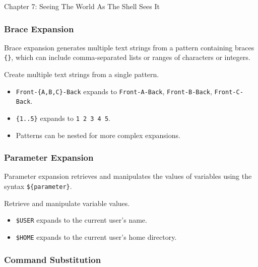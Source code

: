 \begin{notes}{Chapter 7: Seeing The World As The Shell Sees It}
\begin{highlight}
    \end{highlight}
    
    \subsubsection*{Brace Expansion}
    
    Brace expansion generates multiple text strings from a pattern containing braces \texttt{\{\}}, which can include comma-separated lists or ranges of characters or integers.
    
    \begin{highlight}
    
    Create multiple text strings from a single pattern.
    
    \begin{itemize}
        \item \texttt{Front-\{A,B,C\}-Back} expands to \texttt{Front-A-Back}, \texttt{Front-B-Back}, \texttt{Front-C-Back}.
        \item \texttt{\{1..5\}} expands to \texttt{1 2 3 4 5}.
        \item Patterns can be nested for more complex expansions.
    \end{itemize}
    
    \end{highlight}
    
    \subsubsection*{Parameter Expansion}
    
    Parameter expansion retrieves and manipulates the values of variables using the syntax \texttt{\$\{parameter\}}.
    
    \begin{highlight}
    
    Retrieve and manipulate variable values.
    
    \begin{itemize}
        \item \texttt{\$USER} expands to the current user's name.
        \item \texttt{\$HOME} expands to the current user's home directory.
    \end{itemize}
    
    \end{highlight}
    
    \subsubsection*{Command Substitution}
    

\end{notes}
